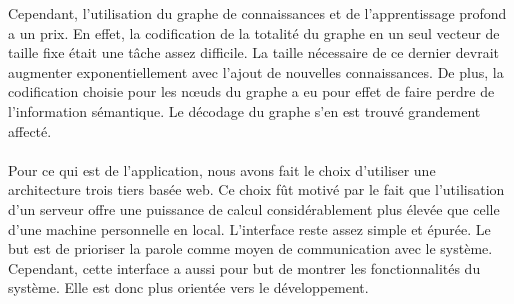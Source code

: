 Cependant, l'utilisation du graphe de connaissances et de l'apprentissage profond a un prix. En effet, la codification de la totalité du graphe en un seul vecteur de taille fixe était une tâche assez difficile. La taille nécessaire de ce dernier devrait augmenter exponentiellement avec l'ajout de nouvelles connaissances. De plus, la codification choisie pour les n\oe{}uds du graphe a eu pour effet de faire perdre de l'information sémantique. Le décodage du graphe s'en est trouvé grandement affecté.





\paragraph{}
Pour ce qui est de l'application, nous avons fait le choix d'utiliser une architecture trois tiers basée web. Ce choix fût motivé par le fait que l'utilisation d'un serveur offre une puissance de calcul considérablement plus élevée que celle d'une machine personnelle en local. L'interface reste assez simple et épurée. Le but est de prioriser la parole comme moyen de communication avec le système. Cependant, cette interface a aussi pour but de montrer les fonctionnalités du système. Elle est donc plus orientée vers le développement.



